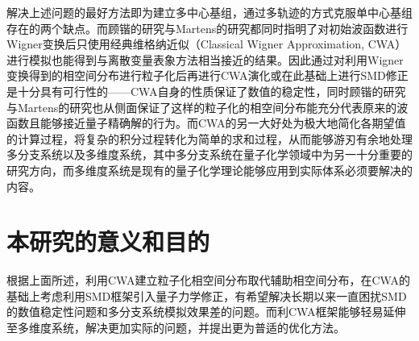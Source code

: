 解决上述问题的最好方法即为建立多中心基组\cite{kaiguPSQHD}，通过多轨迹的方式克服单中心基组存在的两个缺点。而顾锴的研究与Martens的研究都同时指明了对初始波函数进行Wigner变换后只使用经典维格纳近似（Classical Wigner Approximation, CWA）进行模拟也能得到与离散变量表象方法相当接近的结果\cite{kaiguPSQHD,donoso2000simulation}。因此通过对利用Wigner变换得到的相空间分布进行粒子化后再进行CWA演化或在此基础上进行SMD修正是十分具有可行性的——CWA自身的性质保证了数值的稳定性，同时顾锴的研究与Martens的研究也从侧面保证了这样的粒子化的相空间分布能充分代表原来的波函数且能够接近量子精确解的行为。而CWA的另一大好处为极大地简化各期望值的计算过程，将复杂的积分过程转化为简单的求和过程，从而能够游刃有余地处理多分支系统以及多维度系统，其中多分支系统在量子化学领域中为另一十分重要的研究方向，而多维度系统是现有的量子化学理论能够应用到实际体系必须要解决的内容。

\section{本研究的意义和目的}
根据上面所述，利用CWA建立粒子化相空间分布取代辅助相空间分布，在CWA的基础上考虑利用SMD框架引入量子力学修正，有希望解决长期以来一直困扰SMD的数值稳定性问题和多分支系统模拟效果差的问题。而利CWA框架能够轻易延伸至多维度系统，解决更加实际的问题，并提出更为普适的优化方法。
